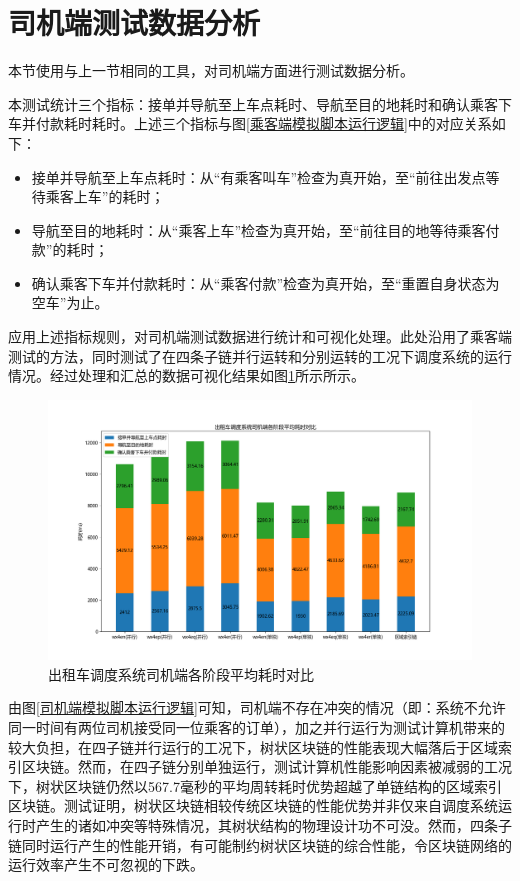 \section{司机端测试数据分析}

本节使用与上一节相同的工具，对司机端方面进行测试数据分析。

本测试统计三个指标：接单并导航至上车点耗时、导航至目的地耗时和确认乘客下车并付款耗时耗时。上述三个指标与图\ref{乘客端模拟脚本运行逻辑}中的对应关系如下：

\begin{itemize}
    \item 接单并导航至上车点耗时：从“有乘客叫车”检查为真开始，至“前往出发点等待乘客上车”的耗时；
    \item 导航至目的地耗时：从“乘客上车”检查为真开始，至“前往目的地等待乘客付款”的耗时；
    \item 确认乘客下车并付款耗时：从“乘客付款”检查为真开始，至“重置自身状态为空车”为止。
\end{itemize}

应用上述指标规则，对司机端测试数据进行统计和可视化处理。此处沿用了乘客端测试的方法，同时测试了在四条子链并行运转和分别运转的工况下调度系统的运行情况。经过处理和汇总的数据可视化结果如图\ref{司机端平均耗时对比}所示所示。

\begin{figure}[htbp]
    \centering
    \includegraphics[width=\textwidth]{images/司机端测试.png}
    \caption{出租车调度系统司机端各阶段平均耗时对比}\label{司机端平均耗时对比} %
\end{figure}

由图\ref{司机端模拟脚本运行逻辑}可知，司机端不存在冲突的情况（即：系统不允许同一时间有两位司机接受同一位乘客的订单），加之并行运行为测试计算机带来的较大负担，在四子链并行运行的工况下，树状区块链的性能表现大幅落后于区域索引区块链。然而，在四子链分别单独运行，测试计算机性能影响因素被减弱的工况下，树状区块链仍然以567.7毫秒的平均周转耗时优势超越了单链结构的区域索引区块链。测试证明，树状区块链相较传统区块链的性能优势并非仅来自调度系统运行时产生的诸如冲突等特殊情况，其树状结构的物理设计功不可没。然而，四条子链同时运行产生的性能开销，有可能制约树状区块链的综合性能，令区块链网络的运行效率产生不可忽视的下跌。

